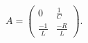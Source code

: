 \documentclass[preview]{standalone}
\begin{document}
\begin{center}
\raggedright
                    \(A = \begin{pmatrix}
                                0 & \frac{1}{C} \\
                                \frac{-1}{L} & \frac{-R}{L}
                            \end{pmatrix}\).
\end{center}
\end{document}
